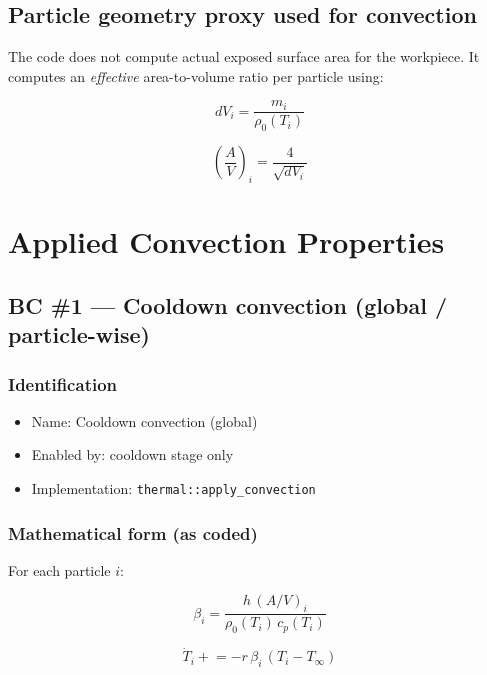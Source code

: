 \documentclass[11pt]{article}
\begin{document}
\subsection{Particle geometry proxy used for convection}

The code does not compute actual exposed surface area for the workpiece. It computes an \emph{effective} area-to-volume ratio per particle using:

\begin{equation}
dV_i = \frac{m_i}{\rho_0(T_i)}
\end{equation}

\begin{equation}
\left(\frac{A}{V}\right)_i = \frac{4}{\sqrt{dV_i}}
\end{equation}

\section{Applied Convection Properties}

\subsection{BC \#1 --- Cooldown convection (global / particle-wise)}

\subsubsection{Identification}

\begin{itemize}
  \item Name: Cooldown convection (global)
  \item Enabled by: cooldown stage only
  \item Implementation: \texttt{thermal::apply\_convection}
\end{itemize}

\subsubsection{Mathematical form (as coded)}

For each particle $i$:

\begin{equation}
\beta_i = \frac{h\,(A/V)_i}{\rho_0(T_i)\,c_p(T_i)}
\end{equation}

\begin{equation}
\dot{T}_i \mathrel{+}= -r \,\beta_i \,(T_i - T_\infty)
\end{equation}
\end{document}
